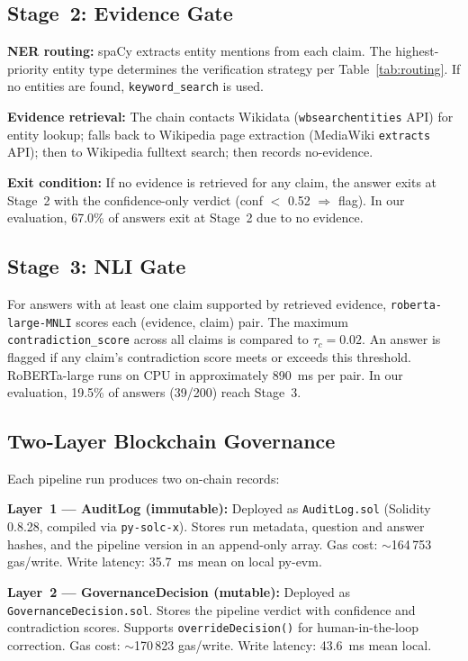 \documentclass[11pt,a4paper]{article}
\newcommand{\tauC}{\tau_c}
\begin{document}
\subsection{Stage~2: Evidence Gate}

\textbf{NER routing:} spaCy extracts entity mentions from each claim. The
highest-priority entity type determines the verification strategy per
Table~\ref{tab:routing}. If no entities are found, \texttt{keyword\_search} is
used.

\textbf{Evidence retrieval:} The chain contacts Wikidata (\texttt{wbsearchentities}
API) for entity lookup; falls back to Wikipedia page extraction (MediaWiki
\texttt{extracts} API); then to Wikipedia fulltext search; then records
no-evidence.

\textbf{Exit condition:} If no evidence is retrieved for any claim, the answer
exits at Stage~2 with the confidence-only verdict (conf $<$ 0.52 $\Rightarrow$
flag). In our evaluation, 67.0\% of answers exit at Stage~2 due to no evidence.

\subsection{Stage~3: NLI Gate}

For answers with at least one claim supported by retrieved evidence,
\texttt{roberta-large-MNLI} scores each (evidence, claim) pair. The maximum
\texttt{contradiction\_score} across all claims is compared to $\tauC = 0.02$.
An answer is flagged if any claim's contradiction score meets or exceeds this
threshold. RoBERTa-large runs on CPU in approximately 890~ms per pair. In our
evaluation, 19.5\% of answers (39/200) reach Stage~3.

\subsection{Two-Layer Blockchain Governance}

Each pipeline run produces two on-chain records:

\textbf{Layer~1 --- AuditLog (immutable):} Deployed as \texttt{AuditLog.sol}
(Solidity 0.8.28, compiled via \texttt{py-solc-x}). Stores run metadata,
question and answer hashes, and the pipeline version in an append-only array.
Gas cost: $\sim$164\,753 gas/write. Write latency: 35.7~ms mean on local
py-evm.

\textbf{Layer~2 --- GovernanceDecision (mutable):} Deployed as
\texttt{GovernanceDecision.sol}. Stores the pipeline verdict with confidence and
contradiction scores. Supports \texttt{overrideDecision()} for human-in-the-loop
correction. Gas cost: $\sim$170\,823 gas/write. Write latency: 43.6~ms mean
local.
\end{document}
